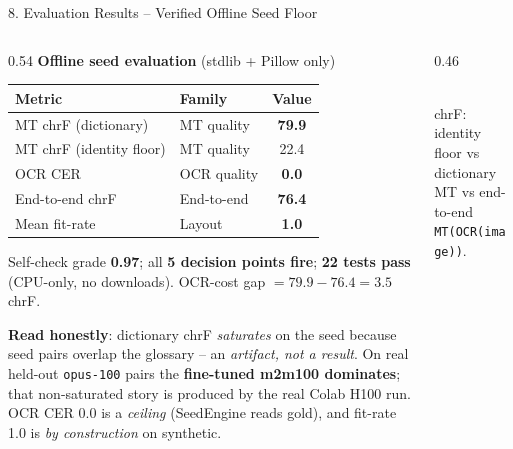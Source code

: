 \documentclass[10pt,aspectratio=169]{beamer}
\begin{document}
\begin{frame}{8. Evaluation Results -- Verified Offline Seed Floor}
\begin{columns}[T]
\begin{column}{0.54\textwidth}
\textbf{Offline seed evaluation} {\scriptsize(stdlib + Pillow only)}
\begin{table}[h]
\centering\scriptsize
\begin{tabular}{llc}
\toprule
\textbf{Metric} & \textbf{Family} & \textbf{Value} \\
\midrule
MT chrF (dictionary) & MT quality & \textbf{79.9} \\
MT chrF (identity floor) & MT quality & 22.4 \\
OCR CER & OCR quality & \textbf{0.0} \\
End-to-end chrF & End-to-end & \textbf{76.4} \\
Mean fit-rate & Layout & \textbf{1.0} \\
\bottomrule
\end{tabular}
\end{table}
\scriptsize Self-check grade \textbf{0.97}; all \textbf{5 decision points fire}; \textbf{22 tests pass} (CPU-only, no downloads). OCR-cost gap $= 79.9 - 76.4 = \mathbf{3.5}$ chrF.

\vspace{0.1cm}
\footnotesize \textbf{Read honestly}: dictionary chrF \emph{saturates} on the seed because seed pairs overlap the glossary -- an \emph{artifact, not a result}. On real held-out \texttt{opus-100} pairs the \textbf{fine-tuned m2m100 dominates}; that non-saturated story is produced by the real Colab H100 run. OCR CER 0.0 is a \emph{ceiling} (SeedEngine reads gold), and fit-rate 1.0 is \emph{by construction} on synthetic.
\end{column}
\begin{column}{0.46\textwidth}
\centering
{}\\
{\tiny chrF: identity floor vs dictionary MT vs end-to-end \texttt{MT(OCR(image))}.}


\end{column}
\end{columns}
\end{frame}
\end{document}
